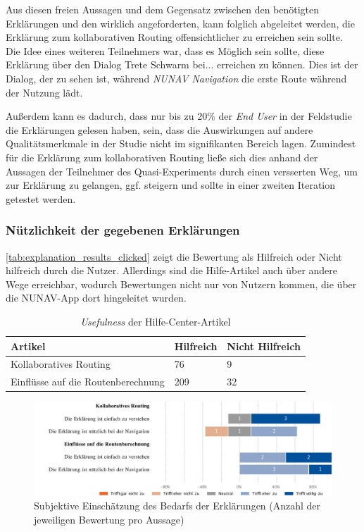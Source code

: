 Aus diesen freien Aussagen und dem Gegensatz zwischen den benötigten Erklärungen und den wirklich angeforderten, kann folglich abgeleitet werden, die Erklärung zum kollaborativen Routing offensichtlicher zu erreichen sein sollte. Die Idee eines weiteren Teilnehmers war, dass es Möglich sein sollte, diese Erklärung über den Dialog \glqq Trete Schwarm bei...\grqq{} erreichen zu können. Dies ist der Dialog, der zu sehen ist, während \textit{NUNAV Navigation} die erste Route während der Nutzung lädt.

Außerdem kann es dadurch, dass nur bis zu 20\% der \textit{End User} in der Feldstudie die Erklärungen gelesen haben, sein, dass die Auswirkungen auf andere Qualitätsmerkmale in der Studie nicht im signifikanten Bereich lagen. Zumindest für die Erklärung zum kollaborativen Routing ließe sich dies anhand der Aussagen der Teilnehmer des Quasi-Experiments durch einen versserten Weg, um zur Erklärung zu gelangen, ggf. steigern und sollte in einer zweiten Iteration getestet werden.



\subsubsection{Nützlichkeit der gegebenen Erklärungen}

\autoref{tab:explanation_results_clicked} zeigt die Bewertung als \glqq Hilfreich\grqq{} oder \glqq Nicht hilfreich\grqq{} durch die Nutzer. Allerdings sind die Hilfe-Artikel auch über andere Wege erreichbar, wodurch Bewertungen nicht nur von Nutzern kommen, die über die NUNAV-App dort hingeleitet wurden.

\begin{table}[htb!]
    \centering
    \begin{tabular}{p{}p{}p{}}
        \hline
        Artikel & Hilfreich & Nicht Hilfreich \\
        \toprule
        Kollaboratives Routing & 76 & 9 \\
        Einflüsse auf die Routenberechnung & 209 & 32 \\
        \bottomrule
    \end{tabular}
    \caption{\textit{Usefulness} der Hilfe-Center-Artikel}
    \label{tab:explanation_results_clicked}
\end{table}

\begin{figure}[htb!]
    \centering
    \includegraphics[width=\textwidth]{contents/06_model_evaluation/02_evaluation/res/qualitativeFeedback-evaluation_usefulness_qualitative.pdf}
    \caption{Subjektive Einschätzung des Bedarfs der Erklärungen (Anzahl der jeweiligen Bewertung pro Aussage)}
    \label{fig:evaluation_usefulness_qualitative}
\end{figure}

